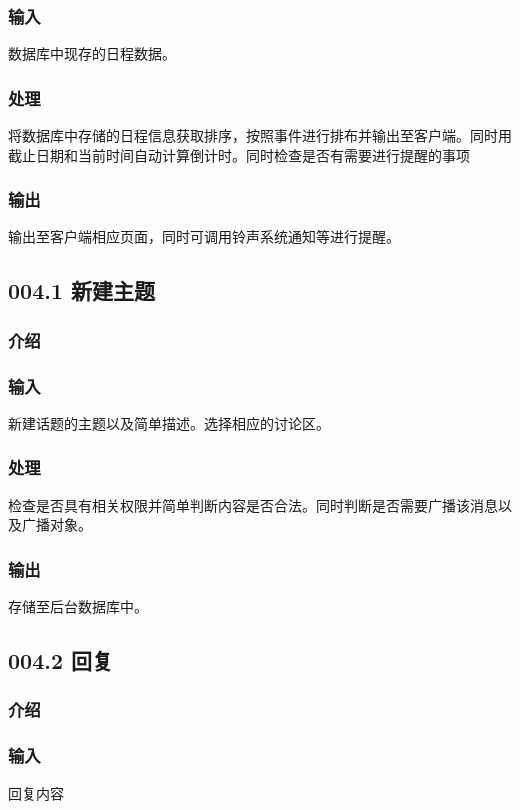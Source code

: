     \subsubsection{输入}
    数据库中现存的日程数据。
    \subsubsection{处理}
    将数据库中存储的日程信息获取排序，按照事件进行排布并输出至客户端。同时用截止日期和当前时间自动计算倒计时。同时检查是否有需要进行提醒的事项
    \subsubsection{输出}
    输出至客户端相应页面，同时可调用铃声系统通知等进行提醒。

  \subsection{004.1 新建主题}
    \subsubsection{介绍}

    \subsubsection{输入}
    新建话题的主题以及简单描述。选择相应的讨论区。
    \subsubsection{处理}
    检查是否具有相关权限并简单判断内容是否合法。同时判断是否需要广播该消息以及广播对象。
    \subsubsection{输出}
    存储至后台数据库中。

  \subsection{004.2 回复}
    \subsubsection{介绍}

    \subsubsection{输入}
    回复内容
